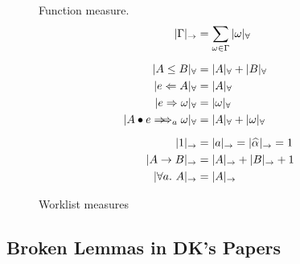 \begin{figure}[h!]
\begin{minipage}[t]{.5\textwidth}
        \centering{} {Function measure.}
        \begin{gather*}
            \begin{aligned}
            |\Gm|_\to &= \sum_{\jg \in \Gm} |\jg|_\forall\\[2mm]
            |A \le B|_\forall &= |A|_\forall + |B|_\forall\\
            |e \Lto A|_\forall &= |A|_\forall\\
            |e \To \jg|_\forall &= |\jg|_\forall\\
            |\appInfAlg{A}{e}|_\forall &= |A|_\forall + |\jg|_\forall\\[2mm]
            |1|_\to &= |a|_\to = |\al|_\to = 1\\
            |A\to B|_\to &= |A|_\to + |B|_\to + 1\\
            |\all A|_\to &= |A|_\to
            \end{aligned}
        \end{gather*}
    \end{minipage}
\caption{Worklist measures}
\label{fig:measures}
\end{figure}

\subsection{Broken Lemmas in DK's Papers}
\label{appendix:false_lemmas}

